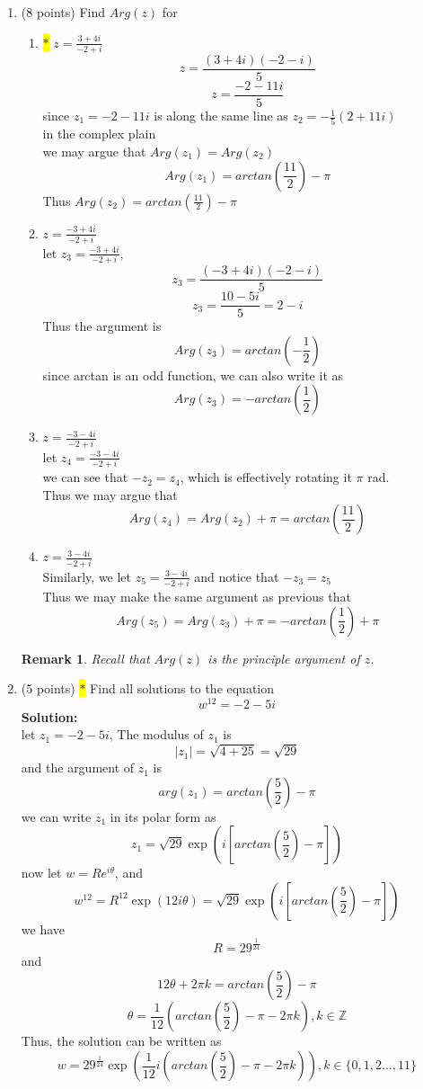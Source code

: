 \documentclass[12pt]{article}
\newtheorem*{remark}{Remark}
\begin{document}
\begin{enumerate}


\item(8 points) Find $Arg(z)$ for
\begin{enumerate}
    \item  \colorbox{yellow}{$\ast$}   $z = \frac{3 + 4i}{-2+i}$
    \[
    z=\frac{(3+4i)(-2-i)}{5}
    \]
    \[
    z=\frac{-2-11i}{5}
    \]
    since $z_1 = -2-11i$ is along the same line as $z_2=-\frac{1}{5}(2+11i)$\\ in the complex plain\\
    we may argue that $Arg(z_1)=Arg(z_2)$\\
    \[
    Arg(z_1)=arctan(\frac{11}{2})-\pi
    \]
    Thus $Arg(z_2) = arctan(\frac{11}{2})-\pi$
    
    \item   $z = \frac{-3 + 4i}{-2+i}$\\
    let $z_3=\frac{-3 + 4i}{-2+i}$, \[
    z_3=\frac{(-3+4i)(-2-i)}{5}
    \]
    \[
    z_3=\frac{10-5i}{5}=2-i
    \]
    Thus the argument is\[
    Arg(z_3)=arctan(-\frac{1}{2})
    \]
    since arctan is an odd function, we can also write it as \[
    Arg(z_3)=-arctan(\frac{1}{2})
    \]
    \item   $z = \frac{-3 - 4i}{-2+i}$\\
    let $z_4 = \frac{-3 - 4i}{-2+i}$\\
    we can see that $-z_2=z_4$, which is effectively rotating it $\pi$ rad.\\
    Thus we may argue that\[
    Arg(z_4)=Arg(z_2)+\pi= arctan(\frac{11}{2})
    \]
    \item   $z = \frac{3 - 4i}{-2+i}$\\
    Similarly, we let $z_5=\frac{3 - 4i}{-2+i}$ and notice that $-z_3=z_5$\\
    Thus we may make the same argument as previous that\[
    Arg(z_5)=Arg(z_3)+\pi=-arctan(\frac{1}{2})+\pi
    \]
\end{enumerate}


\begin{remark}
    Recall that $Arg(z)$ is the principle argument of $z$.  
\end{remark}

\item (5 points)  \colorbox{yellow}{$\ast$}  Find all solutions to the equation 
\[  
w^{12} = -2 - 5i
\]
\textbf{Solution:}\\
let $z_1=-2-5i$, The modulus of $z_1$ is\[
|z_1| = \sqrt{4+25}=\sqrt{29}
\]
and the argument of $z_1$ is\[
arg(z_1)=arctan(\frac{5}{2})-\pi
\]
we can write $z_1$ in its polar form as\[
z_1=\sqrt{29}\exp{(i[arctan(\frac{5}{2})-\pi])}
\]
now let $w=Re^{i\theta}$, and\[
w^{12}=R^{12}\exp{(12i\theta)}=\sqrt{29}\exp{(i[arctan(\frac{5}{2})-\pi])}
\]
we have\[
R=29^{\frac{1}{24}}
\]
and\[
12\theta + 2\pi k=arctan(\frac{5}{2})-\pi
\]
\[
\theta=\frac{1}{12}(arctan(\frac{5}{2})-\pi-2\pi k), k\in\mathbb{Z}
\]
Thus, the solution can be written as\[
w=29^{\frac{1}{24}}\exp{(\frac{1}{12}i(arctan(\frac{5}{2})-\pi-2\pi k))},  k\in\{0,1,2...,11\}
\]


\end{enumerate}
\end{document}
